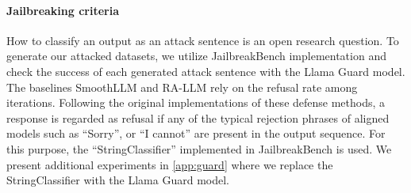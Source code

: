  \paragraph{Jailbreaking criteria}
How to classify an output as an attack sentence is an open research question. To generate our attacked datasets, we utilize JailbreakBench \citep{chao2024jailbreakbench} implementation and check the success of each generated attack sentence with the Llama Guard model. The baselines SmoothLLM and RA-LLM rely on the refusal rate among iterations. Following the original implementations of these defense methods, a response is regarded as refusal if any of the typical rejection phrases of aligned models such as ``Sorry'', or ``I cannot'' are present in the output sequence. For this purpose, the ``StringClassifier'' implemented in JailbreakBench is used. We present additional experiments in \cref{app:guard} where we replace the StringClassifier with the Llama Guard model.


